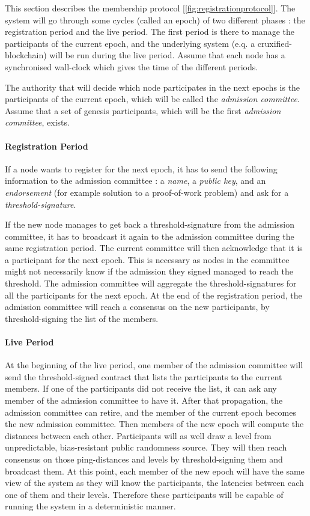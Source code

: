 \documentclass[a4paper,11pt,oneside]{report}
\begin{document}
This section describes the membership protocol [\autoref{fig:registrationprotocol}].
The system will go through some cycles (called an epoch) of two different phases :
the registration period and the live period. The first period is there
to manage the participants of the current epoch, and the underlying system
(e.q. a cruxified-blockchain) will be run during the live period. Assume
that each node has a synchronised wall-clock which gives the time of the
different periods.

The authority that will decide which node participates in the next epochs is
the participants of the current epoch, which will be called the \textit{admission
committee}. Assume that a set of genesis participants, which will be the first
 \textit{admission committee}, exists.

\paragraph{Registration Period}
If a node wants to register for the next epoch, it has to send the following
information to the admission committee : a \textit{name}, a \textit{public key}, and an
 \textit{endorsement} (for example solution to a proof-of-work problem) and ask for a
 \textit{threshold-signature}. 

If the new node manages to get back a threshold-signature from the admission
committee, it has to broadcast it again to the admission committee during the
same registration period. The current committee will then acknowledge that it
is a participant for the next epoch. This is necessary as nodes in the committee might not necessarily know if the admission they signed managed to reach the threshold. The admission committee will aggregate the
threshold-signatures for all the participants for the next epoch. At the end of
the registration period, the admission committee will reach a consensus on the
new participants, by threshold-signing the list of the members.  

\paragraph{Live Period}
At the beginning of the live period, one member of the admission committee will
send the threshold-signed contract that lists the participants to the current members. If
one of the participants did not receive the list, it can ask any member of the
admission committee to have it. After that propagation, the admission committee
can retire, and the member of the current epoch becomes the new admission
committee. Then members of the new epoch will compute the distances between
each other. Participants will as well draw a level from unpredictable,
bias-resistant public randomness source. They will then reach consensus on
those ping-distances and levels by threshold-signing them and broadcast them.
At this point, each member of the new epoch will have the same view of the
system as they will know the participants, the latencies between each one
of them and their levels. Therefore these participants will be capable of
running the system in a deterministic manner.
\end{document}
